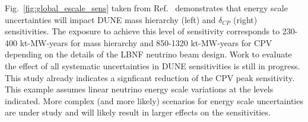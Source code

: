  Fig.~\ref{fig:global_escale_sens} taken from Ref.~\cite{dunecdr} demonstrates that
energy scale uncertainties will impact DUNE 
mass hierarchy (left) and $\delta_{CP}$ (right) sensitivities.
The exposure to achieve this level of sensitivity corresponds to 
 230-400 kt-MW-years for mass hierarchy and  850-1320 kt-MW-years for CPV depending on the 
details of the LBNF neutrino beam design.
Work to evaluate the effect of all systematic uncertainties in DUNE sensitivities is still in progress.
This study already indicates a signficant reduction of the CPV peak sensitivity. 
This example assumes linear neutrino energy scale variations at the levels indicated.
More complex (and more likely) scenarios for energy scale uncertainties are under study and
will likely result in larger effects on the sensitivities.
